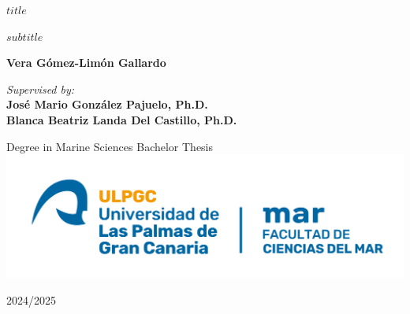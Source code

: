 %
%
%
% 


\begin{center}
    \huge
    \textbf{$title$}
        
    \vspace{0.5cm}
    \LARGE
    $subtitle$
        
    \vspace{0.5cm}
    \textbf{Vera Gómez-Limón Gallardo}
        
    \vspace{0.5cm}
    \textit{Supervised by:}\\
    \textbf{José Mario González Pajuelo, Ph.D.\\Blanca Beatriz Landa Del Castillo, Ph.D.}
        
    \vfill
        
    Degree in Marine Sciences Bachelor Thesis
    \includegraphics[width=\textwidth]{titlepage/logo.png}
        
    \LARGE
    2024/2025\\
        
\end{center}
	
	